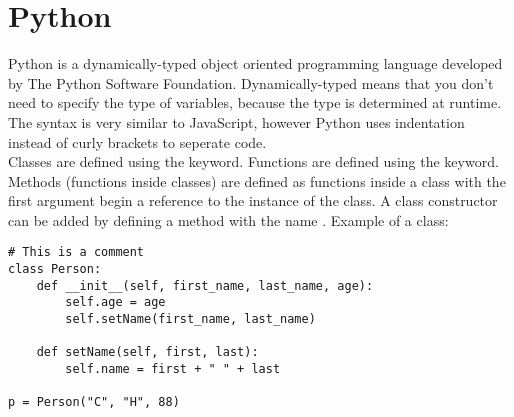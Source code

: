 \section{Python}
Python\cite{PythonOrg} is a dynamically-typed object oriented programming language developed by The Python Software Foundation. Dynamically-typed means that you don't need to specify the type of variables, because the type is determined at runtime. The syntax is very similar to JavaScript, however Python uses indentation instead of curly brackets to seperate code.
\\[11pt]
Classes are defined using the  keyword. Functions are defined using the  keyword. Methods (functions inside classes) are defined as functions inside a class with the first argument begin a reference to the instance of the class. A class constructor can be added by defining a method with the name . Example of a class:
\begin{lstlisting}
# This is a comment
class Person:
    def __init__(self, first_name, last_name, age):
        self.age = age
        self.setName(first_name, last_name)

    def setName(self, first, last):
        self.name = first + " " + last

p = Person("C", "H", 88)
\end{lstlisting}